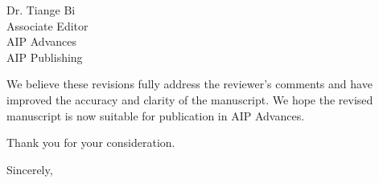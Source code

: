 \documentclass[11pt]{letter}
\begin{document}
\begin{letter}{Dr. Tiange Bi \\ Associate Editor \\ AIP Advances \\ AIP Publishing}
\begin{enumerate}
\end{enumerate}

We believe these revisions fully address the reviewer's comments and have
improved the accuracy and clarity of the manuscript. We hope the revised
manuscript is now suitable for publication in AIP Advances.

Thank you for your consideration.

\closing{Sincerely,}

\end{letter}
\end{document}
